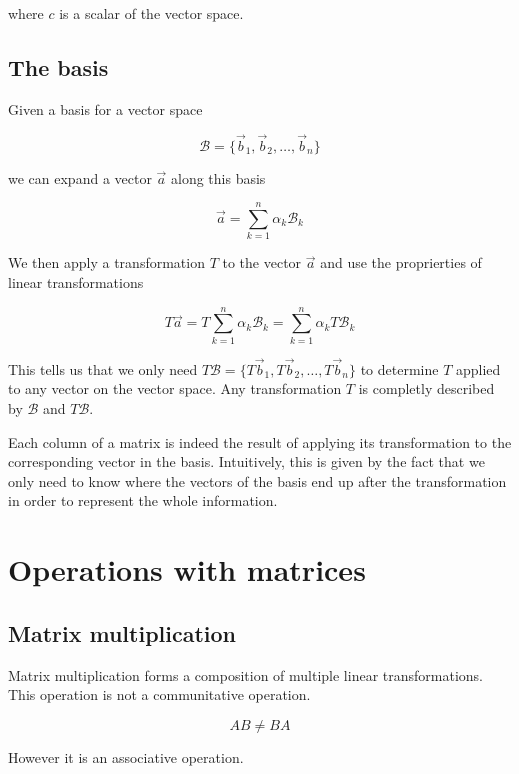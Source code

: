 \documentclass[a4paper]{article}
\begin{document}
where \(c\) is a scalar of the vector space.

\subsection{The basis}

Given a basis for a vector space

\[
    \mathcal{B}=\{\vec{b}_1, \vec{b}_2, \ldots, \vec{b}_n\}
\]

we can expand a vector \(\vec{a}\) along this basis

\[
    \vec{a} = \sum_{k=1}^{n} \alpha_k \mathcal{B}_k
\]

We then apply a transformation \(T\) to the vector \(\vec{a}\) and use the proprierties of
linear transformations

\[
    T\vec{a}
    = T\sum_{k=1}^{n} \alpha_k \mathcal{B}_k
    = \sum_{k=1}^{n} \alpha_k T\mathcal{B}_k
\]

This tells us that we only need \(T\mathcal{B}=\{T\vec{b}_1, T\vec{b}_2, \ldots, T\vec{b}_n\}\)
to determine \(T\) applied to any vector on the vector space.
Any transformation \(T\) is completly described by \(\mathcal{B}\)
and \(T\mathcal{B}\).

Each column of a matrix is indeed the result of applying its transformation
to the corresponding vector in the basis.
Intuitively, this is given by the fact that we only need to know where the vectors of the basis
end up after the transformation in order to represent the whole information.


%
%

\pagebreak

\section{Operations with matrices}

\subsection{Matrix multiplication}

Matrix multiplication forms a composition of multiple linear transformations. \\
This operation is not a communitative operation.

\[
    AB\neq BA
\]

However it is an associative operation.
\end{document}
